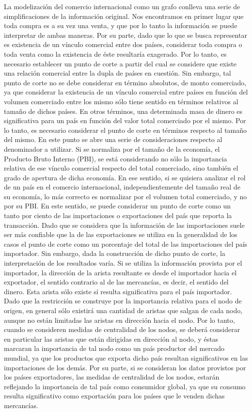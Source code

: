 \documentclass[runningheads,a4paper]{llncs}
\begin{document}
La modelización del comercio internacional como un grafo conlleva una serie de simplificaciones de la información original. Nos encontramos en primer lugar que toda compra es a su vez una venta, y que por lo tanto la información se puede interpretar de ambas maneras. Por su parte, dado que lo que se busca representar es existencia de un vínculo comercial entre dos países, considerar toda compra o toda venta como la existencia de éste resultaría exagerado. Por lo tanto, es necesario establecer un punto de corte a partir del cual se considere que existe una relación comercial entre la dupla de países en cuestión. Sin embargo, tal punto de corte no se debe considerar en término absolutos, de monto comerciado, ya que  considerar la existencia de un vínculo comercial entre países en función del volumen comerciado entre los mismo sólo tiene sentido en términos relativos al tamaño de dichos países. En otros términos, una determinada masa de dinero es significativa para un país en función del valor total comerciado por el mismo. Por lo tanto, es necesario considerar el punto de corte en términos respecto al tamaño del mismo.
En este punto se abre una serie de consideraciones respecto al denominador a utilizar. Si se normaliza por el tamaño de la economía, el Producto Bruto Interno (PBI), se está considerando no sólo la importancia relativa de ese vínculo comercial respecto del total comerciado, sino también el grado de apertura de dicha economía. En ese sentido, si se quisiera analizar el rol de un país en el comercio internacional, independientemente del tamaño real de su economía, lo más correcto es normalizar por el volumen total comerciado, y no por su PBI. En este sentido, se puede considerar un punto de corte como un tanto por ciento de las importaciones o exportaciones del país que reporta la transacción. 
Dado que se considera que la información de las importaciones suele ser más confiable que la de las exportaciones\cite{Fan2014} se utiliza en la generalidad de los casos el punto de corte como un porcentaje del total de las importaciones del país importador. Sin embargo, dada la construcción de dicho punto de corte, la interpretación de los resultados varía. Si se utiliza la información provista por el importador, la dirección de la arista resultante es desde el importador hacia el exportador, el sentido contrario al de las mercancías, es decir, el sentido del dinero. Esta arista sólo existe sí resulta significativa para el país importador. Dado que la restricción se construye por la importancia relativa para el nodo de origen, en general sólo existirá una cantidad de aristas que salgan de cada nodo, aunque no están limitadas las aristas en dirección hacia el nodo. Por lo tanto, cuando se consideren medidas de centralidad de los nodos, se deberá considerar en particular las aristas que están dirigidas en dirección al nodo, y éstas marcaran la importancia de tal nodo como un país productor del mercado mundial, ya que los productos que exporta dicho país resultan significativos en las importaciones de los demás. Por su parte, si se consideran los datos provistos por los países exportadores, las medidas de centralidad de los nodos, estarán reflejando la importancia de tal país como consumidor global, ya que su consumo resulta significativo como exportación para los países que le venden dichas mercancías. 
\end{document}

